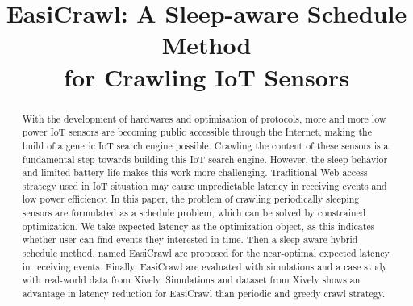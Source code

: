 \documentclass[conference]{IEEEtran}
\begin{document}
\title{EasiCrawl: A Sleep-aware Schedule Method \\for Crawling IoT Sensors}
\author{
}

\maketitle


\begin{abstract}
	
With the development of hardwares and optimisation of protocols, more and more low power IoT sensors are becoming public accessible through the Internet, making the build of a generic IoT search engine possible.
Crawling the content of these sensors is a fundamental step towards building this IoT search engine. However, the sleep behavior and limited battery life makes this work more challenging. Traditional Web access strategy used in IoT situation may cause unpredictable latency in receiving events and low power efficiency. 
In this paper, the problem of crawling periodically sleeping sensors are formulated as a schedule problem, which can be solved by constrained optimization. We take expected latency as the optimization object, as this indicates whether user can find events they interested in time. Then a sleep-aware hybrid schedule method, named EasiCrawl are proposed for the near-optimal expected latency in receiving events. Finally, EasiCrawl are evaluated with simulations and a case study with real-world data from Xively. Simulations and dataset from Xively shows an advantage in latency reduction for EasiCrawl than periodic and greedy crawl strategy.

\end{abstract}

\IEEEpeerreviewmaketitle
\end{document}
